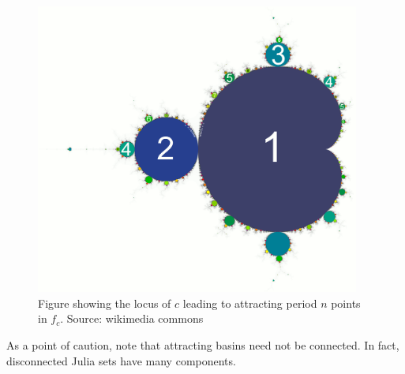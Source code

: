 \documentclass[10pt,a4paper]{article}
\begin{document}
\begin{figure}[H]
  \centering
  \includegraphics[width=0.95\textwidth]{compdyn06.png}
  \caption{Figure showing the locus of $c$ leading to attracting period $n$ points in $f_c$. Source: wikimedia commons}
\end{figure}

As a point of caution, note that attracting basins need not be connected. In fact, disconnected Julia sets have many components.
\end{document}
